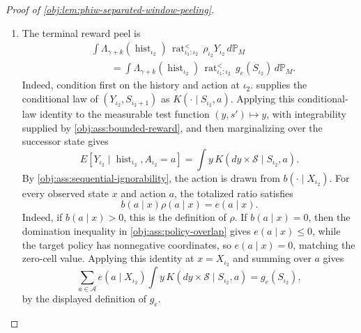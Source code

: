 \documentclass[11pt]{article}
\begin{document}
\begin{proof}[Proof of \cref{obj:lem:phiw-separated-window-peeling}]
\begin{enumerate}
\item The terminal reward peel is
\[
\begin{aligned}
&\int
\Lambda_{\gamma+k}(\operatorname{hist}_{\iota_2})\,
\operatorname{rat}^{<}_{\iota_1:\iota_2}\,
\rho_{\iota_2}Y_{\iota_2}\,d\mathbb P_M  \\
&\qquad =
\int
\Lambda_{\gamma+k}(\operatorname{hist}_{\iota_2})\,
\operatorname{rat}^{<}_{\iota_1:\iota_2}\,
g_e(S_{\iota_2})\,d\mathbb P_M .
\end{aligned}
\]
Indeed, condition first on the history and action at \(\iota_2\).  
supplies the conditional law of \((Y_{\iota_2},S_{\iota_2+1})\) as
\(K(\cdot\mid S_{\iota_2},a)\). Applying this conditional-law identity to the measurable test
function \((y,s')\mapsto y\), with integrability supplied by \cref{obj:ass:bounded-reward}, and then
marginalizing over the successor state gives
\[
E[Y_{\iota_2}\mid \operatorname{hist}_{\iota_2},A_{\iota_2}=a]
=
\int y\,K(dy\times\mathcal S\mid S_{\iota_2},a).
\]
By \cref{obj:ass:sequential-ignorability}, the action is drawn from \(b(\cdot\mid X_{\iota_2})\).  For every observed state \(x\) and action \(a\), the totalized ratio satisfies
\[
b(a\mid x)\rho(a\mid x)=e(a\mid x).
\]
Indeed, if \(b(a\mid x)>0\), this is the definition of \(\rho\). If \(b(a\mid x)=0\), then the
domination inequality in \cref{obj:ass:policy-overlap} gives \(e(a\mid x)\le0\), while the target policy has nonnegative coordinates, so
\(e(a\mid x)=0\), matching the zero-cell value. Applying this identity at \(x=X_{\iota_2}\) and
summing over \(a\) gives
\[
\sum_{a\in\mathcal A}e(a\mid X_{\iota_2})
\int y\,K(dy\times\mathcal S\mid S_{\iota_2},a)
=g_e(S_{\iota_2}),
\]
by the displayed definition of \(g_e\).


\end{enumerate}
\end{proof}
\end{document}
